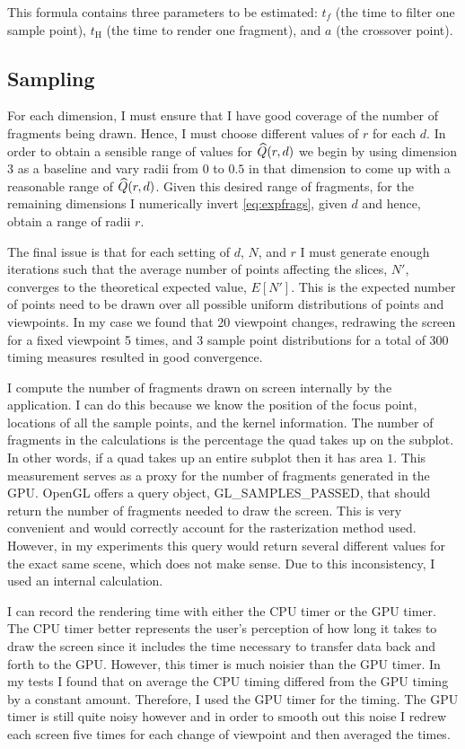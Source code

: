 This formula contains three parameters to be estimated: $t_f$ (the time to filter one sample
point), $t_\text{H}$ (the time to render one fragment), and $a$ (the crossover 
point).

\subsection{Sampling}
\label{sampling}

For each dimension, I must ensure that I have good coverage of the number of
fragments being drawn.
Hence, I must choose different values of $r$ for each $d$.
In order to 
obtain
a sensible range of values for $\widehat{Q}(r,d)$ we begin by using dimension 3
as a baseline and vary radii from $0$ to $0.5$ in that dimension to come 
up with a reasonable
range of $\widehat{Q}(r,d)$.
Given this desired range of fragments,
for the remaining dimensions I numerically invert
\autoref{eq:expfrags},
given $d$ and hence, obtain a range of radii $r$. 

The final issue is that for each setting of $d$, $N$, and $r$ I must
generate enough iterations such that the average number of points affecting
the slices, $N'$, converges to the theoretical expected value, $E[N']$. 
This is the expected number of points need to be drawn over all possible
uniform distributions of points and viewpoints. In my case we found that
20 viewpoint changes, redrawing the screen for a fixed viewpoint 5 times,
and 3 sample
point distributions for a total of 300 timing measures resulted in good
convergence.

I compute the number of fragments drawn on screen internally by the 
application.  I can do this because we know the position of the focus
point, locations of all the sample points, and the kernel information.  
The number of fragments in the calculations is the percentage the quad takes
up on the subplot.
In other words, if a quad takes up an entire subplot then
it has area $1$.
This measurement serves as a proxy 
for the number of fragments generated in the GPU.  
OpenGL offers a query 
object, GL\_SAMPLES\_PASSED, that should return the number of fragments 
needed to draw
the screen.  This is very convenient and would correctly account for the 
rasterization method used.  However, in my experiments this query would 
return several different values for the exact same scene, which does not
make sense.
Due to this inconsistency, I used an internal calculation.

I can record the rendering time with either the CPU timer or the GPU timer.
The CPU timer better represents the user's perception of how long it takes
to draw the screen since it includes the time necessary to transfer data back
and forth to the GPU.  However, this timer is much noisier than the GPU
timer.  In my tests I found that on average the CPU timing differed from
the GPU timing by a constant amount.  Therefore, I used the GPU timer for
the timing.  The GPU timer is still quite noisy however and in order to 
smooth out this noise I redrew each screen five times for each change of
viewpoint and then averaged the times.

